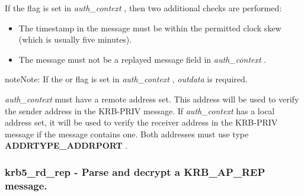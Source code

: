 \documentclass[letterpaper,10pt,english]{sphinxmanual}
\begin{document}
If the {\hyperref[appdev/refs/macros/KRB5_AUTH_CONTEXT_DO_TIME:KRB5_AUTH_CONTEXT_DO_TIME]{}} flag is set in \emph{auth\_context} , then two additional checks are performed:
\begin{itemize}
\item {} 
The timestamp in the message must be within the permitted clock skew (which is usually five minutes).

\item {} 
The message must not be a replayed message field in \emph{auth\_context} .

\end{itemize}

\begin{notice}{note}{Note:}
If the {\hyperref[appdev/refs/macros/KRB5_AUTH_CONTEXT_RET_TIME:KRB5_AUTH_CONTEXT_RET_TIME]{}} or {\hyperref[appdev/refs/macros/KRB5_AUTH_CONTEXT_RET_SEQUENCE:KRB5_AUTH_CONTEXT_RET_SEQUENCE]{}} flag is set in \emph{auth\_context} , \emph{outdata} is required.

\emph{auth\_context} must have a remote address set. This address will be used to verify the sender address in the KRB-PRIV message. If \emph{auth\_context} has a local address set, it will be used to verify the receiver address in the KRB-PRIV message if the message contains one. Both addresses must use type \textbf{ADDRTYPE\_ADDRPORT} .
\end{notice}


\subsubsection{krb5\_rd\_rep -  Parse and decrypt a KRB\_AP\_REP message.}
\label{appdev/refs/api/krb5_rd_rep::doc}\label{appdev/refs/api/krb5_rd_rep:krb5-rd-rep-parse-and-decrypt-a-krb-ap-rep-message}

\begin{fulllineitems}
\label{appdev/refs/api/krb5_rd_rep:c.krb5_rd_rep}
\end{fulllineitems}
\end{document}
